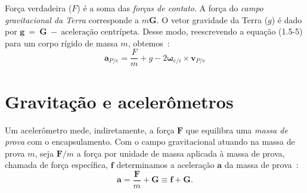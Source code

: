 Força verdadeira (\(F\)) é a soma das \textit{forças de contato}. A força do  \textit{campo gravitacional da Terra} corresponde a \(m\mathbf{G}\). O vetor gravidade da Terra (\(g\)) é dado por {\(\mathbf{g}~=~\mathbf{G}~-~\text{aceleração centrípeta}\)}. Desse modo, reescrevendo a equação (1.5-5) para um corpo rígido de massa \(m\), obtemos~\cite{Stevens2016}:
\begin{equation*} \tag{1.5-6}
    \mathbf{a}_{P/e} = \frac{F}{m} + g - {2 \mathbf{\omega}_{e/i}}\!\times\!{\mathbf{v}_{P/e}}
\end{equation*}



\section{Gravitação e acelerômetros}

Um acelerômetro mede, indiretamente\footnotemark{}, a força \(\mathbf{F}\) que equilibra uma \emph{massa de prova} com o encapsulamento. Com o campo gravitacional atuando na massa de prova \(m\), seja \(\mathbf{F}/m\) a força por unidade de massa aplicada à massa de prova, chamada de força específica, \(\mathbf{f}\) determinamos a aceleração \(\mathbf{a}\) da massa de prova~\cite{Stevens2016}:
\begin{equation*}
    \mathbf{a} = \dfrac{\mathbf{F}}{m} + \mathbf{G} \equiv \mathbf{f} + \mathbf{G}.
\end{equation*}

